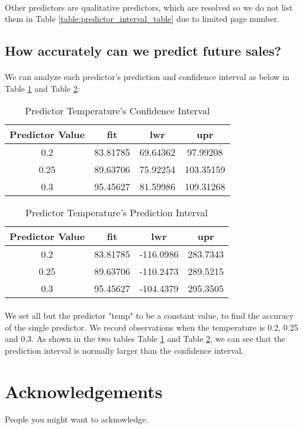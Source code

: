 \documentclass{article}[]
\begin{document}
\paragraph{}
Other predictors are qualitative predictors, which are resolved so we do not list them in Table \ref{table:predictor_interval_table} due to limited page number.

\subsection{How accurately can we predict future sales?}
\paragraph{}
We can analyze each predictor's prediction and confidence interval as below in Table \ref{table:confidence_interval_table} and Table \ref{table:prediction_interval_table}:
\begin{table}
\caption{Predictor Temperature's Confidence Interval}
\centering
\begin{tabular}{c|c|c|c}
\hline
{\bf Predictor Value}&{\bf fit}&{\bf lwr}&{\bf upr}\\
\hline
0.2 &83.81785 &69.64362  &97.99208\\
0.25 &89.63706 &75.92254 &103.35159\\
0.3 &95.45627 &81.59986 &109.31268\\
\hline
\end{tabular}
\label{table:confidence_interval_table}
\end{table}

\begin{table}
\caption{Predictor Temperature's Prediction Interval}
\centering
\begin{tabular}{c|c|c|c}
\hline
{\bf Predictor Value}&{\bf fit}&{\bf lwr}&{\bf upr}\\
\hline
0.2 &83.81785 &-116.0986 &283.7343\\
0.25 &89.63706 &-110.2473 &289.5215\\
0.3 &95.45627 &-104.4379 &295.3505\\
\hline
\end{tabular}
\label{table:prediction_interval_table}
\end{table}

\paragraph{}
We set all but the predictor "temp" to be a constant value, to find the accuracy of the single predictor. We record observations when the temperature is 0.2, 0.25 and 0.3. As shown in the two tables Table \ref{table:confidence_interval_table} and Table \ref{table:prediction_interval_table}, we can see that the prediction interval is normally larger than the confidence interval.

\section{Acknowledgements}
People you might want to acknowledge.
\end{document}
